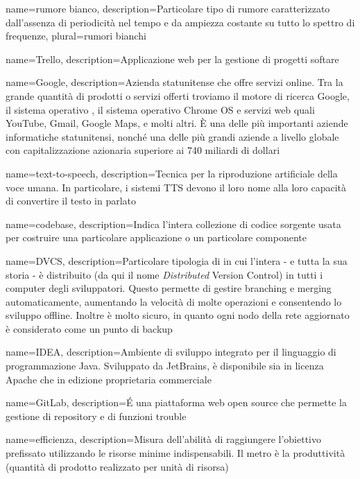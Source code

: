 {
	name=rumore bianco,
	description={Particolare tipo di rumore caratterizzato dall'assenza di periodicità nel tempo e da ampiezza costante su tutto lo spettro di frequenze},
	plural=rumori bianchi
}

{
	name=Trello,
	description={Applicazione web per la gestione di progetti softare}
}

{
	name=Google,
	description={Azienda statunitense che offre servizi online. Tra la grande quantità di prodotti o servizi offerti troviamo il motore di ricerca Google, il sistema operativo , il sistema operativo Chrome OS e servizi web quali YouTube, Gmail, Google Maps,  e molti altri.
È una delle più importanti aziende informatiche statunitensi, nonché una delle più grandi aziende a livello globale con capitalizzazione azionaria superiore ai 740 miliardi di dollari}
}

{
	name=text-to-speech,
	description={Tecnica per la riproduzione artificiale della voce umana. In particolare, i sistemi TTS devono il loro nome alla loro capacità di convertire il testo in parlato}
}

{
	name=codebase,
	description={Indica l'intera collezione di codice sorgente usata per costruire una particolare applicazione o un particolare componente}
}

{
	name=DVCS,
	description={Particolare tipologia di  in cui l'intera  - e tutta la sua storia - è distribuito (da qui il nome \emph{Distributed} Version Control) in tutti i computer degli sviluppatori. Questo permette di gestire branching e merging automaticamente, aumentando la velocità di molte operazioni e consentendo lo sviluppo offline. Inoltre è molto sicuro, in quanto ogni nodo della rete aggiornato è considerato come un punto di backup}
}

{
	name=IDEA,
	description={Ambiente di sviluppo integrato per il linguaggio di programmazione Java. Sviluppato da JetBrains, è disponibile sia in licenza Apache che in edizione proprietaria commerciale}
}

{
	name=GitLab,
	description={\'E una piattaforma web open source che permette la gestione di repository  e di funzioni trouble }
}

{
	name=efficienza,
	description={Misura dell’abilità di raggiungere l’obiettivo prefissato utilizzando le risorse minime indispensabili. Il metro è la produttività (quantità di prodotto realizzato per unità di risorsa)}
}

